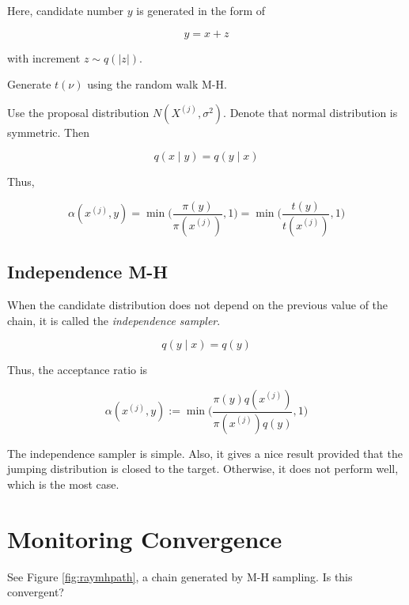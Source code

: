 \documentclass[]{book}
\theoremstyle{definition}
\theoremstyle{definition}
\theoremstyle{definition}
\theoremstyle{remark}
\let\BeginKnitrBlock\begin \let\EndKnitrBlock\end
\begin{document}
Here, candidate number \(y\) is generated in the form of

\begin{equation}
  y = x + z
  \label{eq:symcandpt}
\end{equation}

with increment \(z \sim q(\lvert z \rvert)\).

\BeginKnitrBlock{example}[Random walk metropolis]
\protect\hypertarget{exm:mct}{}{\label{exm:mct} {} }Generate \(t(\nu)\) using the random walk M-H.
\EndKnitrBlock{example}

Use the proposal distribution \(N(X^{(j)}, \sigma^2)\). Denote that normal distribution is symmetric. Then

\[q(x \mid y) = q(y \mid x)\]

Thus,

\[\alpha(x^{(j)}, y) = \min \bigg(\frac{\pi(y)}{\pi(x^{(j)})}, 1 \bigg) = \min \bigg( \frac{t(y)}{t(x^{(j)})}, 1 \bigg)\]

\hypertarget{independence-m-h}{%
\subsection{Independence M-H}\label{independence-m-h}}

When the candidate distribution does not depend on the previous value of the chain, it is called the \emph{independence sampler}.

\begin{equation}
  q(y \mid x) = q(y)
  \label{eq:indepjump}
\end{equation}

Thus, the acceptance ratio is

\begin{equation}
  \alpha(x^{(j)}, y) := \min \bigg(\frac{\pi(y) q(x^{(j)})}{\pi(x^{(j)}) q(y)}, 1 \bigg)
  \label{eq:indepacc}
\end{equation}

The independence sampler is simple. Also, it gives a nice result provided that the jumping distribution is closed to the target. Otherwise, it does not perform well, which is the most case.

\hypertarget{monitoring-convergence}{%
\section{Monitoring Convergence}\label{monitoring-convergence}}

See Figure \ref{fig:raymhpath}, a chain generated by M-H sampling. Is this convergent?
\end{document}
